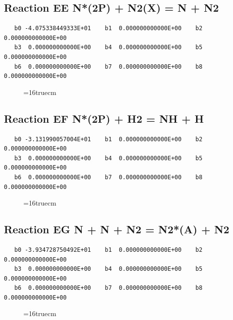 \documentclass[12pt,dvipdfm]{article}
\begin{document}
\subsection{
Reaction EE N*(2P) + N2(X) = N + N2}
\begin{small}\begin{verbatim}
   b0 -4.075338449333E+01    b1  0.000000000000E+00    b2  0.000000000000E+00
   b3  0.000000000000E+00    b4  0.000000000000E+00    b5  0.000000000000E+00
   b6  0.000000000000E+00    b7  0.000000000000E+00    b8  0.000000000000E+00
   \end{verbatim}\end{small}
\begin{figure}[h!]
\label{n2rates}
\epsfxsize=16truecm
\end{figure}
\newpage

\subsection{
Reaction EF N*(2P) + H2 = NH + H}
\begin{small}\begin{verbatim}
   b0 -3.131990057004E+01    b1  0.000000000000E+00    b2  0.000000000000E+00
   b3  0.000000000000E+00    b4  0.000000000000E+00    b5  0.000000000000E+00
   b6  0.000000000000E+00    b7  0.000000000000E+00    b8  0.000000000000E+00
   \end{verbatim}\end{small}
\begin{figure}[h!]
\label{n2rates}
\epsfxsize=16truecm
\end{figure}
\newpage

\subsection{
Reaction EG N + N + N2 = N2*(A) + N2}
\begin{small}\begin{verbatim}
   b0 -3.934728750492E+01    b1  0.000000000000E+00    b2  0.000000000000E+00
   b3  0.000000000000E+00    b4  0.000000000000E+00    b5  0.000000000000E+00
   b6  0.000000000000E+00    b7  0.000000000000E+00    b8  0.000000000000E+00
   \end{verbatim}\end{small}
\begin{figure}[h!]
\label{n2rates}
\epsfxsize=16truecm
\end{figure}
\newpage
\end{document}
